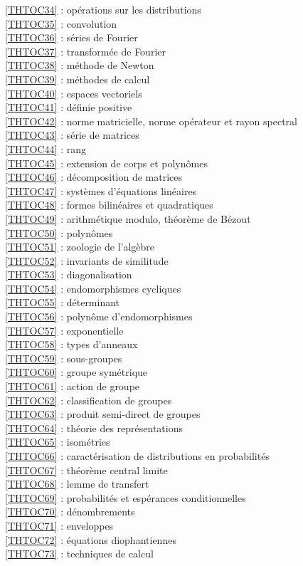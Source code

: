 \ref {THTOC34} : opérations sur les distributions\\
\ref {THTOC35} : convolution\\
\ref {THTOC36} : séries de Fourier\\
\ref {THTOC37} : transformée de Fourier\\
\ref {THTOC38} : méthode de Newton\\
\ref {THTOC39} : méthodes de calcul\\
\ref {THTOC40} : espaces vectoriels\\
\ref {THTOC41} : définie positive\\
\ref {THTOC42} : norme matricielle, norme opérateur et rayon spectral\\
\ref {THTOC43} : série de matrices\\
\ref {THTOC44} : rang\\
\ref {THTOC45} : extension de corps et polynômes\\
\ref {THTOC46} : décomposition de matrices\\
\ref {THTOC47} : systèmes d'équations linéaires\\
\ref {THTOC48} : formes bilinéaires et quadratiques\\
\ref {THTOC49} : arithmétique modulo, théorème de Bézout\\
\ref {THTOC50} : polynômes\\
\ref {THTOC51} : zoologie de l'algèbre\\
\ref {THTOC52} : invariants de similitude\\
\ref {THTOC53} : diagonalisation\\
\ref {THTOC54} : endomorphismes cycliques\\
\ref {THTOC55} : déterminant\\
\ref {THTOC56} : polynôme d'endomorphismes\\
\ref {THTOC57} : exponentielle\\
\ref {THTOC58} : types d'anneaux\\
\ref {THTOC59} : sous-groupes\\
\ref {THTOC60} : groupe symétrique\\
\ref {THTOC61} : action de groupe\\
\ref {THTOC62} : classification de groupes\\
\ref {THTOC63} : produit semi-direct de groupes\\
\ref {THTOC64} : théorie des représentations\\
\ref {THTOC65} : isométries\\
\ref {THTOC66} : caractérisation de distributions en probabilités\\
\ref {THTOC67} : théorème central limite\\
\ref {THTOC68} : lemme de transfert\\
\ref {THTOC69} : probabilités et espérances conditionnelles\\
\ref {THTOC70} : dénombrements\\
\ref {THTOC71} : enveloppes\\
\ref {THTOC72} : équations diophantiennes\\
\ref {THTOC73} : techniques de calcul\\
